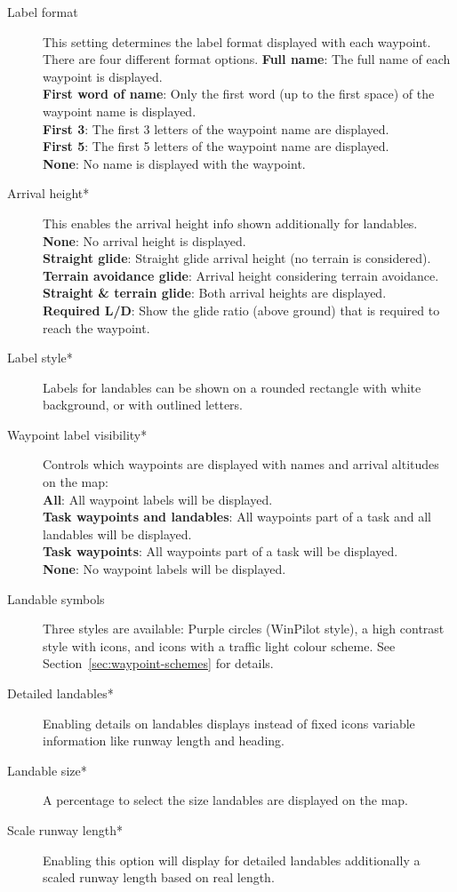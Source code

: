 \begin{description}
\item[Label format]  This setting \label{conf:labels} determines the label format 
  displayed with each waypoint. There are four different format options.
  {\bf Full name}: The full name of each waypoint is displayed. \\
  {\bf First word of name}: Only the first word (up to the first space) of the 
  waypoint name is displayed. \\
  {\bf First 3}: The first 3 letters of the waypoint name are displayed. \\
  {\bf First 5}: The first 5 letters of the waypoint name are displayed. \\
  {\bf None}: No name is displayed with the waypoint.
\item[Arrival height*]  This enables the arrival height info shown additionally 
  for landables. \\
  {\bf None}: No arrival height is displayed. \\
  {\bf Straight glide}: Straight glide arrival height (no terrain is considered). \\
  {\bf Terrain avoidance glide}: Arrival height considering terrain avoidance. \\
  {\bf Straight \& terrain glide}: Both arrival heights are
  displayed. \\
  {\bf Required L/D}: Show the glide ratio (above ground) that is
  required to reach the waypoint.
\item[Label style*]  Labels for landables can be shown on a rounded rectangle with 
  white background, or with outlined letters.
\item[Waypoint label visibility*]  \label{conf:labelvisibility} Controls which waypoints 
  are displayed with names and arrival altitudes on the map: \\
  {\bf All}: All waypoint labels will be displayed. \\
  {\bf Task waypoints and landables}: All waypoints part of a task and all landables 
  will be displayed. \\
  {\bf Task waypoints}: All waypoints part of a task will be displayed. \\
  {\bf None}:  No waypoint labels will be displayed.
\item[Landable symbols]  \label{conf:waypointicons} Three styles are available:
  Purple circles (WinPilot style), a high contrast style with icons,
  and icons with a traffic light colour scheme. See Section~\ref{sec:waypoint-schemes} for details.
\item[Detailed landables*]  Enabling details on landables displays instead of fixed icons 
  variable information like runway length and heading.
\item[Landable size*]  A percentage to select the size landables are displayed on the map.
\item[Scale runway length*]  Enabling this option will display for detailed landables 
  additionally a scaled runway length based on real length.
\end{description}


